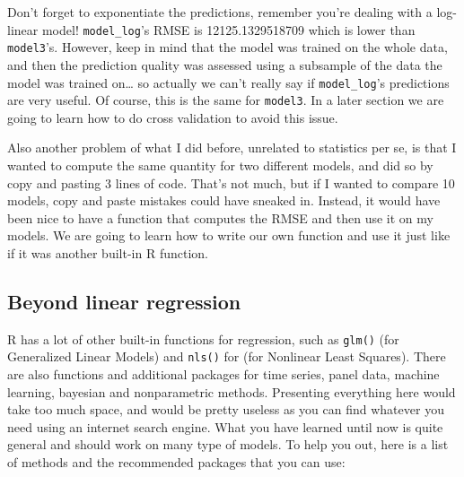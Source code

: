 \documentclass[
]{article}
\begin{document}
Don't forget to exponentiate the predictions, remember you're dealing with a log-linear model! \texttt{model\_log}'s
RMSE is 12125.1329518709 which is lower than \texttt{model3}'s. However, keep in mind that the model was trained
on the whole data, and then the prediction quality was assessed using a subsample of the data the
model was trained on\ldots{} so actually we can't really say if \texttt{model\_log}'s predictions are very useful.
Of course, this is the same for \texttt{model3}.
In a later section we are going to learn how to do cross validation to avoid this issue.

Also another problem of what I did before, unrelated to statistics per se, is that I wanted to compute
the same quantity for two different models, and did so by copy and pasting 3 lines of code. That's not
much, but if I wanted to compare 10 models, copy and paste mistakes could have sneaked in. Instead,
it would have been nice to have a function that computes the RMSE and then use it on my models. We
are going to learn how to write our own function and use it just like if it was another built-in
R function.

\hypertarget{beyond-linear-regression}{%
\subsection{Beyond linear regression}\label{beyond-linear-regression}}

R has a lot of other built-in functions for regression, such as \texttt{glm()} (for Generalized Linear
Models) and \texttt{nls()} for (for Nonlinear Least Squares). There are also functions and additional
packages for time series, panel data, machine learning, bayesian and nonparametric methods.
Presenting everything here would take too much space, and would be pretty useless as you can find
whatever you need using an internet search engine. What you have learned until now is quite general
and should work on many type of models. To help you out, here is a list of methods and the
recommended packages that you can use:
\end{document}
